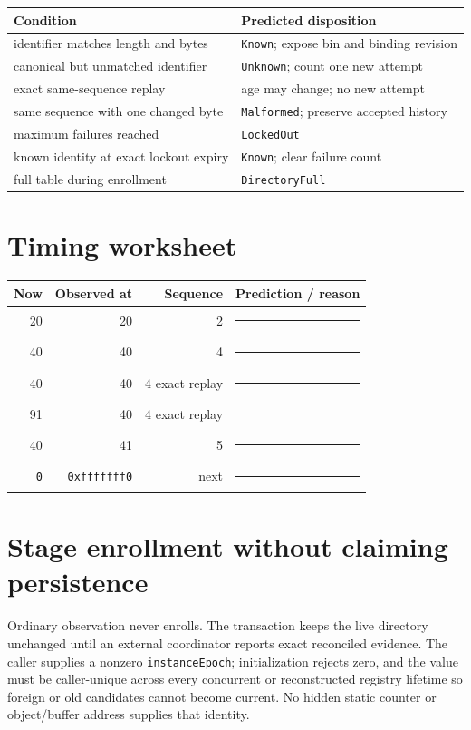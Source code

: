 \documentclass[11pt]{article}
\newcommand{\blankline}{\rule{0.9in}{0.4pt}}
\begin{document}
\begin{tabularx}{\linewidth}{@{}l X@{}}
\toprule
Condition & Predicted disposition\\
\midrule
identifier matches length and bytes & \texttt{Known}; expose bin and binding revision\\
canonical but unmatched identifier & \texttt{Unknown}; count one new attempt\\
exact same-sequence replay & age may change; no new attempt\\
same sequence with one changed byte & \texttt{Malformed}; preserve accepted history\\
maximum failures reached & \texttt{LockedOut}\\
known identity at exact lockout expiry & \texttt{Known}; clear failure count\\
full table during enrollment & \texttt{DirectoryFull}\\
\bottomrule
\end{tabularx}

\section{Timing worksheet}
\begin{tabularx}{\linewidth}{@{}r r r X@{}}
\toprule
Now & Observed at & Sequence & Prediction / reason\\
\midrule
20 & 20 & 2 & \blankline\\[6pt]
40 & 40 & 4 & \blankline\\[6pt]
40 & 40 & 4 exact replay & \blankline\\[6pt]
91 & 40 & 4 exact replay & \blankline\\[6pt]
40 & 41 & 5 & \blankline\\[6pt]
\texttt{0} & \texttt{0xfffffff0} & next & \blankline\\
\bottomrule
\end{tabularx}

\newpage
\section{Stage enrollment without claiming persistence}
Ordinary observation never enrolls. The transaction keeps the live directory
unchanged until an external coordinator reports exact reconciled evidence.
The caller supplies a nonzero \texttt{instanceEpoch}; initialization rejects
zero, and the value must be caller-unique across every concurrent or
reconstructed registry lifetime so foreign or old candidates cannot become
current. No hidden static counter or object/buffer address supplies that
identity.
\end{document}
